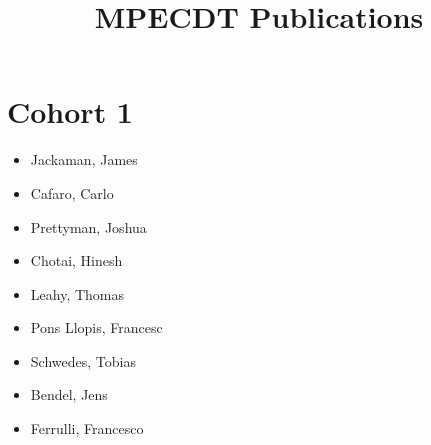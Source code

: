 \documentclass{article}
\title{MPECDT Publications}
\author{}
\date{}
\begin{document}
\maketitle
\section*{Cohort 1}
\begin{itemize}
    \item Jackaman, James \cite{jackaman2019design, jackaman2020quasinorms,jackaman2021conservative} %
    \item Cafaro, Carlo \cite{cafaro2019added, cafaro2018characteristics} %
    \item Prettyman, Joshua \cite{prettyman2018novel, prettyman2019generalized,prettyman2022power}
    \item Chotai, Hinesh \cite{chassagneux2017forward, chassagneux2017introduction, chassagneux2017mathematical, chassagneux2017description, chassagneux2017numerical,chassagneux2017case}
    \item Leahy, Thomas \cite{leahy2018using}
    \item Pons Llopis, Francesc \cite{llopis2018particle,leahy2018using}
    \item Schwedes, Tobias \cite{schwedes2017mesh,schwedes2017introduction, schwedes2017application} %
    \item Bendel, Jens
    \item Ferrulli, Francesco \cite{safronov2019eigenvalues, ferrulli2020complex}
\end{itemize}
\end{document}
